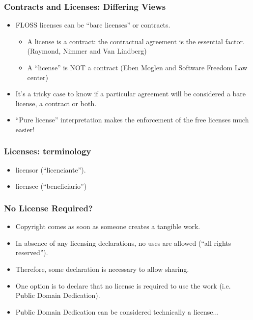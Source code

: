 
\begin{frame}
\frametitle{Contracts and Licenses: Differing Views}

\begin{itemize}
\item FLOSS licenses can be ``bare licenses'' or contracts.
\begin{itemize}
  \item A license is a contract: the contractual agreement is the essential factor. (Raymond, Nimmer and Van Lindberg) 
  \item A ``license'' is NOT a contract (Eben Moglen and Software Freedom Law center)
\end{itemize}
\item It's a tricky case to know if a particular agreement will be considered a bare license, a contract  or both.
\item ``Pure license'' interpretation makes the enforcement of the free licenses much easier!
\end{itemize}

\end{frame}


\begin{frame}
\frametitle{Licenses: terminology}

\begin{itemize}
\item licensor (``licenciante'').
\item licensee (``beneficiario'')
\end{itemize}

\end{frame}



\begin{frame}
\frametitle{No License Required?}

\begin{itemize}
\item Copyright comes as soon as someone creates a tangible work.
\item In absence of any licensing declarations, no uses are allowed (``all rights reserved'').
\item Therefore, some declaration is necessary to allow sharing.
\item One option is to declare that no license is required to use the work (i.e. Public Domain Dedication). 
\item Public Domain Dedication can be considered technically a license...
\end{itemize}

\end{frame}

